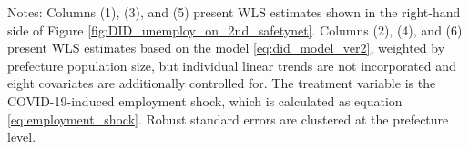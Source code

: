 \begin{table}
\begin{threeparttable}
\begin{tablenotes}
\small
\item [] Notes:  Columns (1), (3), and (5) present WLS estimates shown in the right-hand side of Figure \ref{fig:DID_unemploy_on_2nd_safetynet}. Columns (2), (4), and (6) present WLS estimates based on the model \eqref{eq:did_model_ver2}, weighted by prefecture population size, but individual linear trends are not incorporated and eight covariates are additionally controlled for. The treatment variable is the COVID-19-induced employment shock, which is calculated as equation \eqref{eq:employment_shock}. Robust standard errors are clustered at the prefecture level.
\end{tablenotes}
\end{threeparttable}
\end{table}
